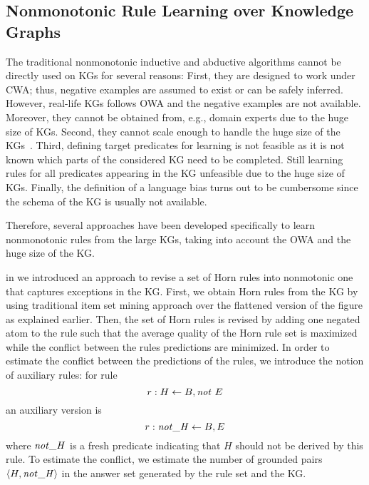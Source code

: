 \subsection{Nonmonotonic Rule Learning over Knowledge Graphs}
 The traditional nonmonotonic inductive and abductive algorithms cannot be directly used on KGs for several reasons:
First, they are designed to work under CWA; thus, negative examples are assumed to exist or can be safely inferred. However, real-life KGs follows OWA and the negative examples are not available. Moreover, they cannot be obtained from, e.g., domain experts due to the huge size of KGs.
Second, they cannot scale enough to handle the huge size of the KGs~\cite{Shakerin2018}. 
 Third, defining target predicates for learning is not feasible as
it is not known which parts of the considered KG need to be completed. Still learning rules for all predicates appearing in the KG unfeasible due to the huge
size of KGs. Finally,
the definition of a language bias turns out to be cumbersome since the schema of the
KG is usually not available.

Therefore, several approaches have been developed specifically to learn nonmonotonic rules from the large KGs, taking into account the OWA and the huge size of the KG.


 in \cite{gad2016} we introduced an approach to revise a set of Horn rules into nonmotonic one that captures exceptions in the KG. First, we obtain Horn rules from the KG by using traditional item set mining approach over the flattened version of the figure as explained earlier. Then, the set of Horn rules is revised by adding one negated atom to the rule such that the average quality of the Horn rule set is maximized while the conflict between the rules predictions are minimized. In order to estimate the conflict between the predictions of the rules, we introduce the notion of auxiliary rules: for rule 
\[r:H \leftarrow B, \mathit{not}~ E\] an auxiliary version is \[r:\mathit{not\_H} \leftarrow B, E\] where $\mathit{not\_H}$ is a fresh predicate indicating that $H$ should not be derived by this rule. To estimate the conflict, we estimate the number of grounded pairs $\langle H,\mathit{not\_H}\rangle$ in the answer set generated by the rule set and the KG.


